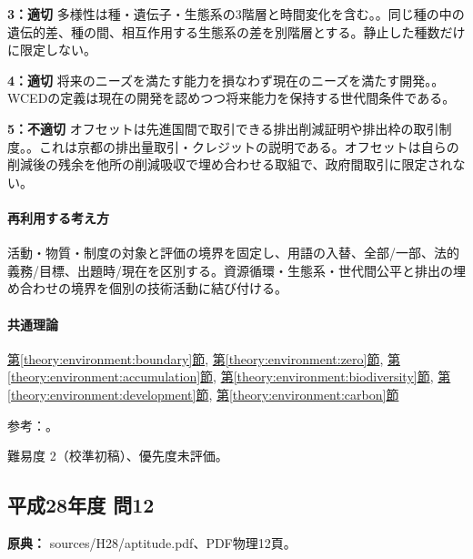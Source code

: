 \noindent\textbf{3：適切} 多様性は種・遺伝子・生態系の3階層と時間変化を含む。。同じ種の中の遺伝的差、種の間、相互作用する生態系の差を別階層とする。静止した種数だけに限定しない。\par

\noindent\textbf{4：適切} 将来のニーズを満たす能力を損なわず現在のニーズを満たす開発。。WCEDの定義は現在の開発を認めつつ将来能力を保持する世代間条件である。\par

\noindent\textbf{5：不適切} オフセットは先進国間で取引できる排出削減証明や排出枠の取引制度。。これは京都の排出量取引・クレジットの説明である。オフセットは自らの削減後の残余を他所の削減吸収で埋め合わせる取組で、政府間取引に限定されない。\par

\paragraph{再利用する考え方} 活動・物質・制度の対象と評価の境界を固定し、用語の入替、全部/一部、法的義務/目標、出題時/現在を区別する。資源循環・生態系・世代間公平と排出の埋め合わせの境界を個別の技術活動に結び付ける。

\paragraph{共通理論} \hyperref[theory:environment:boundary]{第\ref*{theory:environment:boundary}節}, \hyperref[theory:environment:zero]{第\ref*{theory:environment:zero}節}, \hyperref[theory:environment:accumulation]{第\ref*{theory:environment:accumulation}節}, \hyperref[theory:environment:biodiversity]{第\ref*{theory:environment:biodiversity}節}, \hyperref[theory:environment:development]{第\ref*{theory:environment:development}節}, \hyperref[theory:environment:carbon]{第\ref*{theory:environment:carbon}節}

\par 参考：\cite{env_zero2008,env_foodchain,env_biodiversity,env_development,env_offset2008}。

\par 難易度 2（校準初稿）、優先度未評価。

\subsection{平成28年度 問12}
\label{q:h28-reg-apt-12}

\noindent\textbf{原典：} sources/H28/aptitude.pdf、PDF物理12頁。

